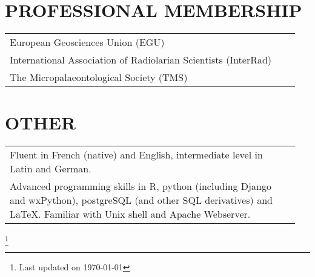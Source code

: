\documentclass[11pt, a4paper]{article}
\begin{document}
\section{PROFESSIONAL MEMBERSHIP}
\begin{longtable}{p{0.94\linewidth} p{0.01\linewidth}}
European Geosciences Union (EGU) & \\
International Association of Radiolarian Scientists (InterRad) & \\
The Micropalaeontological Society (TMS) & \\
\end{longtable}

\section{OTHER}
\begin{longtable}{P{0.94\linewidth} p{0.01\linewidth}}
Fluent in French (native) and English, intermediate level in Latin and German. & \\
Advanced programming skills in R, python (including Django and wxPython), postgreSQL (and other SQL derivatives) and \LaTeX. Familiar with Unix shell and Apache Webserver. & \\
\end{longtable}

{\let\thefootnote\relax\footnote{Last updated on \today}}
\end{document}
